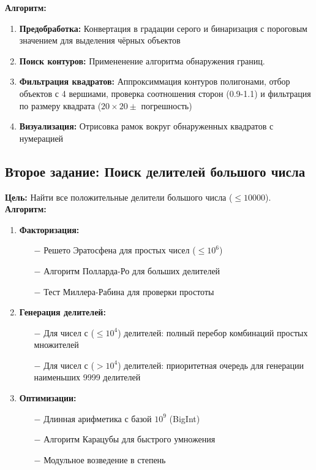 \documentclass[oneside,a4paper,14pt]{extarticle}
\begin{document}
\noindent\textbf{Алгоритм:}
\begin{enumerate}
    \item \textbf{Предобработка:} Конвертация в градации серого и бинаризация с пороговым значением для выделения чёрных объектов
    \item \textbf{Поиск контуров:} Примененение алгоритма обнаружения границ.
    \item \textbf{Фильтрация квадратов:} Аппроксиммация контуров полигонами, отбор объектов с 4 вершиами, проверка соотношения сторон (0.9-1.1) и фильтрация по размеру квадрата ($20 \times 20 \pm$ погрешность)
    \item \textbf{Визуализация:} Отрисовка рамок вокруг обнаруженных квадратов с нумерацией
\end{enumerate}

\clearpage

\subsection{Второе задание: Поиск делителей большого числа}

\textbf{Цель:} Найти все положительные делители большого числа ($\leq10000$).\\

\noindent\textbf{Алгоритм:}
\begin{enumerate}
    \item \textbf{Факторизация:}
    \begin{itemize}
        \item[$-$] Решето Эратосфена для простых чисел ($\leq 10^6$)
        \item[$-$] Алгоритм Полларда-Ро для больших делителей
        \item[$-$] Тест Миллера-Рабина для проверки простоты
    \end{itemize}
    \item \textbf{Генерация делителей:}
    \begin{itemize}
        \item[$-$] Для чисел с ($\leq10^4$) делителей: полный перебор комбинаций простых множителей
        \item[$-$] Для чисел с ($>10^4$) делителей: приоритетная очередь для генерации наименьших 9999 делителей
    \end{itemize}
    \item \textbf{Оптимизации:}
    \begin{itemize}
        \item[$-$] Длинная арифметика с базой $10^9$ (BigInt)
        \item[$-$] Алгоритм Карацубы для быстрого умножения
        \item[$-$] Модульное возведение в степень
    \end{itemize}
\end{enumerate}
\end{document}
